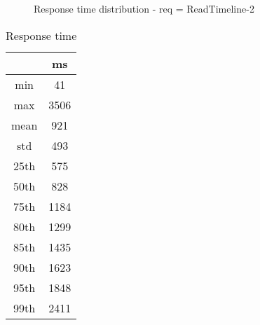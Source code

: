 \begin{minipage}{0.75\linewidth}
\begin{figure}[h]
\begin{adjustbox}{max width=1.0\linewidth, keepaspectratio}
  \end{adjustbox}
  \caption{Response time distribution - req = ReadTimeline-2}
\end{figure}
\end{minipage}\hfill\begin{minipage}{0.18\linewidth}
\begin{table}[h]
\begin{tabular}{|cc|}
\hline
\textbf{} & \textbf{ms}\\ \hline
 \Xhline{0.005\arrayrulewidth}
min & 41\\
 \Xhline{0.005\arrayrulewidth}
max & 3506\\
 \Xhline{0.005\arrayrulewidth}
mean & 921\\
 \Xhline{0.005\arrayrulewidth}
std & 493\\
\hline
\hline
 \Xhline{0.005\arrayrulewidth}
25th & 575\\
 \Xhline{0.005\arrayrulewidth}
50th & 828\\
 \Xhline{0.005\arrayrulewidth}
75th & 1184\\
 \Xhline{0.005\arrayrulewidth}
80th & 1299\\
 \Xhline{0.005\arrayrulewidth}
85th & 1435\\
 \Xhline{0.005\arrayrulewidth}
90th & 1623\\
 \Xhline{0.005\arrayrulewidth}
95th & 1848\\
 \Xhline{0.005\arrayrulewidth}
99th & 2411\\
\hline
\end{tabular}
\caption{Response time}
\end{table}
\end{minipage}\hfill